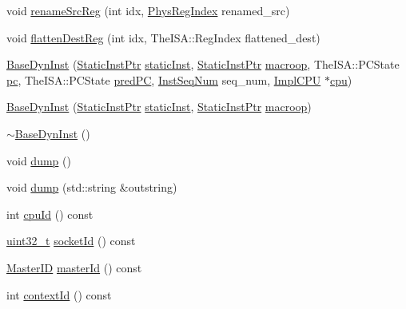 \begin{DoxyCompactItemize}
\item 
void \hyperlink{classBaseDynInst_af3d4e52aa8ea0b526cd9f78f67127f36}{renameSrcReg} (int idx, \hyperlink{o3_2comm_8hh_a5ec29599c4bc29a3054c451674969e7b}{PhysRegIndex} renamed\_\-src)
\item 
void \hyperlink{classBaseDynInst_aa63107f986e5c741f58413c6643298fb}{flattenDestReg} (int idx, TheISA::RegIndex flattened\_\-dest)
\item 
\hyperlink{classBaseDynInst_a840565bb821f30293af92f0db4ddb28a}{BaseDynInst} (\hyperlink{classRefCountingPtr}{StaticInstPtr} \hyperlink{classBaseDynInst_a6799d48af805bf0bd72441e882589a6a}{staticInst}, \hyperlink{classRefCountingPtr}{StaticInstPtr} \hyperlink{classBaseDynInst_a239d33ed2aa6ba1b897533642aa107a2}{macroop}, TheISA::PCState \hyperlink{classBaseDynInst_ad3585c83b0eac985107aa5a86e43e1b4}{pc}, TheISA::PCState \hyperlink{classBaseDynInst_aebd0b135745958ac2bdfe9deeeb60d9f}{predPC}, \hyperlink{inst__seq_8hh_a258d93d98edaedee089435c19ea2ea2e}{InstSeqNum} seq\_\-num, \hyperlink{classBaseDynInst_a9792f311b2805cbefb8cb15c1c4a4cf5}{ImplCPU} $\ast$\hyperlink{classBaseDynInst_af0927cfb92eca43bfa3bfd5ce19af308}{cpu})
\item 
\hyperlink{classBaseDynInst_a7ebce8e9adfcd43b1e8b3a58f235d289}{BaseDynInst} (\hyperlink{classRefCountingPtr}{StaticInstPtr} \hyperlink{classBaseDynInst_a6799d48af805bf0bd72441e882589a6a}{staticInst}, \hyperlink{classRefCountingPtr}{StaticInstPtr} \hyperlink{classBaseDynInst_a239d33ed2aa6ba1b897533642aa107a2}{macroop})
\item 
\hyperlink{classBaseDynInst_af446a3befb983b87ef04566ad283c371}{$\sim$BaseDynInst} ()
\item 
void \hyperlink{classBaseDynInst_accd2600060dbaee3a3b41aed4034c63c}{dump} ()
\item 
void \hyperlink{classBaseDynInst_a5d337b0f151368459d1a95a6470f18ca}{dump} (std::string \&outstring)
\item 
int \hyperlink{classBaseDynInst_a1e2d18ebf4e21f2416c21a8b072e2c7b}{cpuId} () const 
\item 
\hyperlink{Type_8hh_a435d1572bf3f880d55459d9805097f62}{uint32\_\-t} \hyperlink{classBaseDynInst_a1ff97b43199001357718671a4d922d12}{socketId} () const 
\item 
\hyperlink{request_8hh_ac366b729262fd8e7cbd3283da6f775cf}{MasterID} \hyperlink{classBaseDynInst_aef8c47228ab905833941bc0e1918c871}{masterId} () const 
\item 
int \hyperlink{classBaseDynInst_a651d5d14e7a4e95ebe6d7f5b8ee5a107}{contextId} () const 

\end{DoxyCompactItemize}
